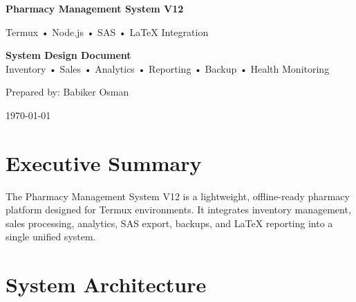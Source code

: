 \documentclass[12pt,a4paper]{article}
\begin{document}
\begin{titlepage}
\centering

\vspace*{2cm}

{\Huge\bfseries\color{mainblue}
Pharmacy Management System V12\par}

\vspace{0.5cm}

{\Large Termux • Node.js • SAS • LaTeX Integration\par}

\vspace{1.5cm}

\begin{tcolorbox}[
colback=lightblue,
colframe=mainblue,
width=0.85\textwidth,
arc=4mm,
boxrule=0.8pt]

\centering
\textbf{System Design Document}\\
Inventory • Sales • Analytics • Reporting • Backup • Health Monitoring

\end{tcolorbox}

\vfill

{\large Prepared by: Babiker Osman\par}
{\large \today\par}

\end{titlepage}

\section{Executive Summary}

\begin{tcolorbox}[
colback=lightblue,
colframe=mainblue,
title=Overview]

The Pharmacy Management System V12 is a lightweight, offline-ready pharmacy platform designed for Termux environments. It integrates inventory management, sales processing, analytics, SAS export, backups, and LaTeX reporting into a single unified system.

\end{tcolorbox}

\section{System Architecture}
\end{document}
